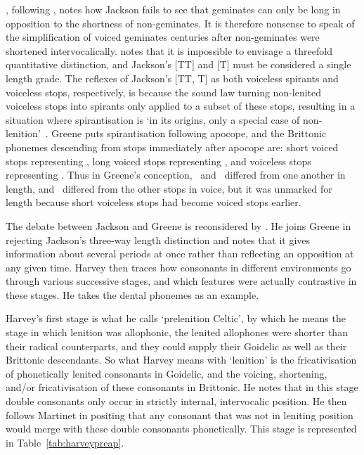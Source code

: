 \Textcite{greene_gemination_1956}, following \textcite{martinet_celtic_1952}, notes how Jackson fails to see that geminates can only be long in opposition to the shortness of non-geminates. It is therefore nonsense to speak of the simplification of voiced geminates centuries after non-geminates were shortened intervocalically. \Textcite{Gre_Spirant66} notes that it is impossible to envisage a threefold quantitative distinction, and Jackson's [TT] and [T] must be considered a single length grade. The  reflexes of Jackson's [TT, T] as both voiceless spirants and voiceless stops, respectively, is because the sound law turning non-lenited voiceless stops into spirants  only applied to a subset of these stops, resulting in a situation where spirantisation is `in its origins, only a special case of non-lenition'~\autocite[119]{Gre_Spirant66}. Greene puts spirantisation following apocope, and the Brittonic phonemes descending from stops immediately after apocope are: short voiced stops representing \lT, long voiced stops representing \xD, and voiceless stops representing \xT. Thus in Greene's conception, \lT\ and \xD\ differed from one another in length, and \xT\ differed from the other stops in voice, but it was unmarked for length because short voiceless stops had become voiced stops earlier.


The debate between Jackson and Greene is reconsidered by \textcite{harvey_aspects_1984}. He joins Greene in rejecting Jackson's three-way length distinction and notes that it gives information about several periods at once rather than reflecting an opposition at any given time. Harvey then traces how consonants in different environments go through various successive stages, and which features were actually contrastive in these stages. He takes the dental phonemes as an example.

Harvey's first stage is what he calls `prelenition Celtic', by which he means the stage in which lenition was allophonic, the lenited allophones were shorter than their radical counterparts, and they could supply their Goidelic as well as their Brittonic descendants. So what Harvey means with `lenition' is the fricativisation of phonetically lenited consonants in Goidelic, and the voicing, shortening, and/or fricativisation of these consonants in Brittonic. He notes that in this stage double consonants only occur in strictly internal, intervocalic position. He then follows Martinet in positing that any consonant that was not in leniting position would merge with these double consonants phonetically. This stage is represented in Table~\ref{tab:harveypreap}.


